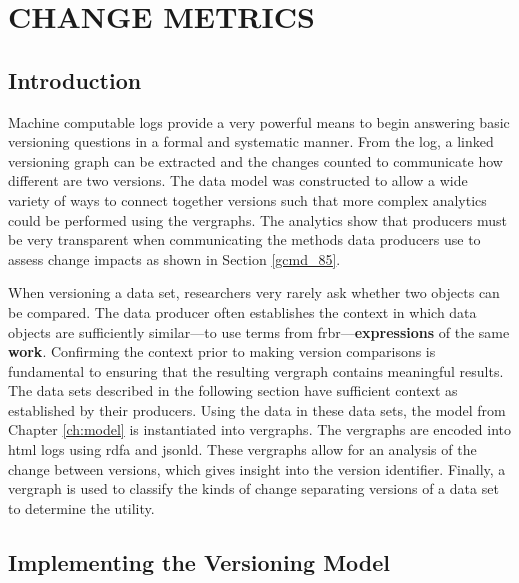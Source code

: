 
\chapter{CHANGE METRICS}\label{ch:graph}

\section{Introduction}

Machine computable \glspl{log} provide a very powerful means to begin answering basic versioning questions in a formal and systematic manner.
From the \gls{log}, a \gls{linked} versioning graph can be extracted and the changes counted to communicate how different are two \glspl{version}.
The data model was constructed to allow a wide variety of ways to connect together \glspl{version} such that more complex analytics could be performed using the \glspl{vergraph}.
The analytics show that producers must be very transparent when communicating the methods data producers use to assess change impacts as shown in Section \ref{gcmd_85}.

When versioning a data set, researchers very rarely ask whether two objects can be compared.
The data producer often establishes the context in which data objects are sufficiently similar---to use terms from \gls{frbr}---\textbf{expressions} of the same \textbf{work}.
Confirming the context prior to making version comparisons is fundamental to ensuring that the resulting \gls{vergraph} contains meaningful results.
The data sets described in the following section have sufficient context as established by their producers.
Using the data in these data sets, the model from Chapter \ref{ch:model} is instantiated into \glspl{vergraph}.
The \glspl{vergraph} are encoded into \gls{html} \glspl{log} using \gls{rdfa} and \gls{jsonld}.
These \glspl{vergraph} allow for an analysis of the change between versions, which gives insight into the version identifier.
Finally, a \gls{vergraph} is used to classify the kinds of \gls{change} separating \glspl{version} of a data set to determine the utility.

\section{Implementing the Versioning Model}

